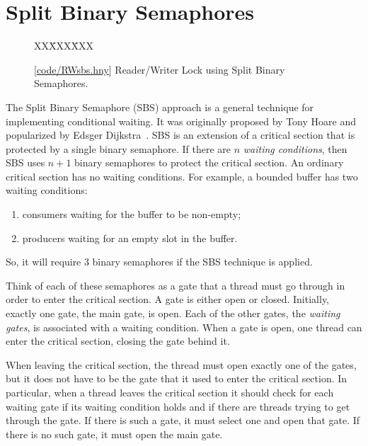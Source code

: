 \documentclass{report}
\newcommand{\harmonysource}[1]{
\begin{tabbing}
XX\=XXX\=XXX\kill
    
\end{tabbing}
}
\newcommand{\harmonylink}[1]{%
[\href{https://harmony.cs.cornell.edu/#1}{\underline{#1}}]%
}
\newenvironment{code}{
\tcolorbox
}{
\endtcolorbox
}
\begin{document}
\chapter{Split Binary Semaphores}
\label{ch:sbs}
%

\begin{figure}
\begin{code}
\harmonysource{RWsbs}
\end{code}
\caption{\harmonylink{code/RWsbs.hny} Reader/Writer Lock using Split Binary Semaphores.}
\label{fig:RWsplitsema}
\end{figure}

%

The Split Binary Semaphore (SBS) approach is a general technique for
implementing conditional waiting.  It was originally proposed by
Tony Hoare and popularized by Edsger Dijkstra~\cite{EWD703}.
SBS is an extension of a critical section that is protected by a single
binary semaphore.
If there are $n$ \emph{waiting conditions},
then SBS uses $n+1$ binary semaphores to protect the critical section.
An ordinary critical section has no waiting conditions.
For example, a bounded buffer has two waiting conditions:
\begin{enumerate}
\item consumers waiting for the buffer to be non-empty;
\item producers waiting for an empty slot in the buffer.
\end{enumerate}
So, it will require 3 binary semaphores if the SBS technique is applied.

Think of each of these semaphores as a gate that a thread must go
through in order to enter the critical section.  A gate is either open
or closed.  Initially, exactly one gate, the main gate, is open.
Each of the other gates, the \emph{waiting gates}, is associated with a
waiting condition.
When a gate is open, one thread can enter the critical section,
closing the gate behind it.

When leaving the critical section, the thread must open exactly one
of the gates, but it does not have to be the gate that it used to enter
the critical section.
In particular, when a thread leaves the critical section it should
check for each waiting gate if its waiting condition holds and if there are
threads trying to get through the gate.  If there is such a gate,
it must select one and open that gate.  If there is no such gate,
it must open the main gate.
\end{document}
